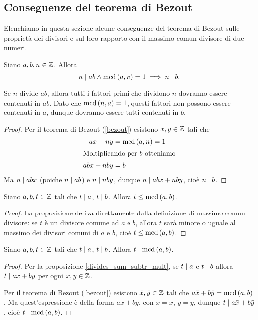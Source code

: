 \subsection{Conseguenze del teorema di Bezout}

Elenchiamo in questa sezione alcune conseguenze del teorema di Bezout sulle proprietà dei divisori e sul loro rapporto con il massimo comun divisore di due numeri.

\begin{proposition} \label{n_divides_product}
    Siano $a, b, n \in \mathbb{Z}$. Allora \begin{equation}
        n \mid ab \land \operatorname{mcd}\left(a, n\right) = 1 \implies n \mid b.
    \end{equation}
\end{proposition}
\begin{intuition}
    Se $n$ divide $ab$, allora tutti i fattori primi che dividono $n$ dovranno essere contenuti in $ab$. Dato che $\operatorname{mcd}\left(n, a\right) = 1$, questi fattori non possono essere contenuti in $a$, dunque dovranno essere tutti contenuti in $b$.
\end{intuition}
\begin{proof}
    Per il teorema di Bezout (\ref{bezout}) esistono $x, y \in \mathbb{Z}$ tali che 
    \begin{align*}
        ax + ny &= \operatorname{mcd}\left(a, n\right) = 1 \\
        \intertext{Moltiplicando per $b$ otteniamo}
        abx + nby &= b 
    \end{align*}
    Ma $n \mid abx$ (poiche $n \mid ab$) e $n \mid nby$, dunque $n \mid abx + nby$, 
    cioè $n \mid b$.
\end{proof}

\begin{proposition} \label{greatest_common_divisor}
    Siano $a, b, t \in \mathbb{Z}$ tali che $t \mid a$, $t \mid b$. Allora $t \leq \operatorname{mcd}\left(a, b\right)$.
\end{proposition}
\begin{proof}
    La proposizione deriva direttamente dalla definizione di massimo comun divisore: se $t$ è un divisore comune ad $a$ e $b$, allora $t$ sarà minore o uguale al massimo dei divisori comuni di $a$ e $b$, cioè $t \leq \operatorname{mcd}\left(a, b\right)$.
\end{proof}

\begin{proposition} \label{divisori_dividono_mcd}
    Siano $a, b, t \in \mathbb{Z}$ tali che $t \mid a$, $t \mid b$.  Allora $t \mid \operatorname{mcd}\left(a, b\right)$.
\end{proposition}
\begin{proof}
    Per la proposizione \ref{divides_sum_subtr_mult}, se $t \mid a$ e $t \mid b$ allora $t \mid ax+by$ per ogni $x, y \in \mathbb{Z}$.

    Per il teorema di Bezout (\ref{bezout}) esistono $\bar{x}, \bar{y} \in \mathbb{Z}$ tali che $a\bar{x}+b\bar{y} = \operatorname{mcd}\left(a, b\right)$. Ma quest'espressione è della forma $ax + by$, con $x = \bar{x}$, $y = \bar{y}$, dunque 
    $t \mid a\bar{x} + b\bar{y}$, cioè $t \mid \operatorname{mcd}\left(a, b\right)$.
\end{proof}

